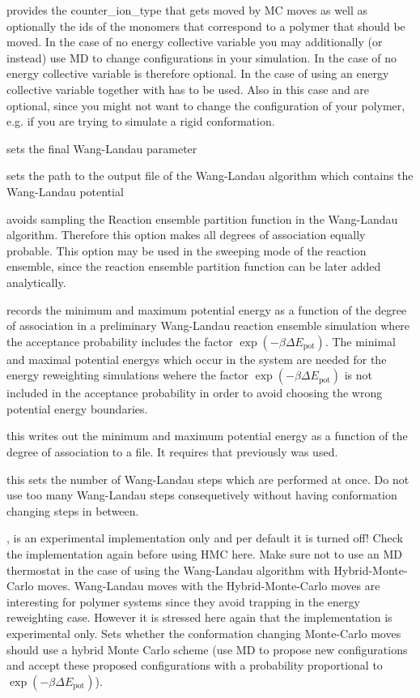  provides the counter\_ion\_type that gets moved by MC moves as
well as optionally the ids of the monomers that correspond to a polymer that
should be moved. In the case of no energy collective variable you may
additionally (or instead) use MD to change configurations in your simulation.
In the case of no energy collective variable  is therefore
optional. In the case of using an energy collective variable 
together with  has to be used. Also in this case
 and  are optional, since you
might not want to change the configuration of your polymer, e.g. if you are
trying to simulate a rigid conformation.

 sets the final Wang-Landau parameter

 sets the path to the output file of the Wang-Landau algorithm which contains the Wang-Landau potential

 avoids sampling the Reaction ensemble partition function in the Wang-Landau algorithm. Therefore this option makes all degrees of association equally probable. This option may be used in the sweeping mode of the reaction ensemble, since the reaction ensemble partition function can be later added analytically.

 records the minimum and maximum potential energy as a function of the degree of association in a preliminary Wang-Landau reaction ensemble simulation where the acceptance probability includes the factor $\exp(-\beta \Delta E_\text{pot})$. The minimal and maximal potential energys which occur in the system are needed for the energy reweighting simulations wehere the factor $\exp(-\beta \Delta E_\text{pot})$ is not included in the acceptance probability in order to avoid choosing the wrong potential energy boundaries.

 this writes out the minimum and maximum potential energy as a function of the degree of association to a file. It requires that previously  was used.

 this sets the number of Wang-Landau steps which are performed at once. Do not use too many Wang-Landau steps consequetively without having conformation changing steps in between.


, is an experimental implementation only and per default it is turned off! Check the implementation again before using HMC here. Make sure not to use an MD thermostat in the case of using the Wang-Landau algorithm with Hybrid-Monte-Carlo moves. Wang-Landau moves with the Hybrid-Monte-Carlo moves are interesting for polymer systems since they avoid trapping in the energy reweighting case. However it is stressed here again that the implementation is experimental only. Sets whether the conformation changing Monte-Carlo moves should use a hybrid Monte Carlo scheme (use MD to propose new configurations and accept these proposed configurations with a probability proportional to $\exp(-\beta \Delta E_\text{pot})$).

